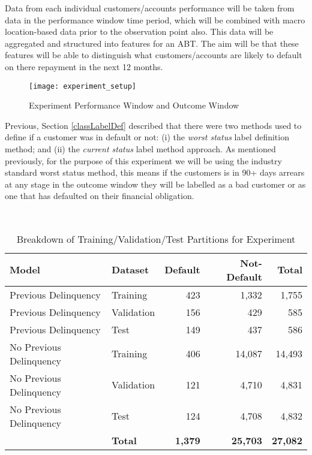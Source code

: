 Data from each individual customers/accounts performance will be taken from data in the performance window time period, which will be combined with macro location-based data prior to the observation point also. This data will be aggregated and structured into features for an ABT. The aim will be that these features will be able to distinguish what customers/accounts are likely to default on there repayment in the next 12 months. 

\begin{figure}[h!]
	\texttt{[image: experiment\_setup]}
	\caption[Experiment Performance Window and Outcome Window]
	{Experiment Performance Window and Outcome Window}
	\label{fig:experiment_setup}
\end{figure}

Previous, Section \ref{classLabelDef} described that there were two methods used to define if a customer was in default or not: (i) the \textit{worst status} label definition method; and (ii) the \textit{current status} label method approach. As mentioned previously, for the purpose of this experiment we will be using the industry standard worst status method, this means if the customers is in 90+ days arrears at any stage in the outcome window they will be labelled as a bad customer or as one that has defaulted on their financial obligation. 

\begin{table}[H]
	\centering\
	\resizebox{\textwidth}{!}
	{
		\begin{tabular}{l| l|r|r|r}
			\hline
			\textbf{Model} &  \textbf{Dataset} & \textbf{Default} & \textbf{Not-Default} & \textbf{Total} \\
			\hline
			Previous Delinquency          & Training       & 423 & 1,332 & 1,755 \\
			Previous Delinquency          & Validation       & 156 & 429 & 585 \\
			Previous Delinquency          & Test & 149 & 437 & 586 \\ \hline
			No Previous Delinquency          & Training & 406 & 14,087 & 14,493 \\ 
			No Previous Delinquency          & Validation & 121 & 4,710 & 4,831 \\
			No Previous Delinquency          & Test & 124 & 4,708 & 4,832 \\
			\hline
		       &      	\textbf{Total }     & \textbf{1,379} & \textbf{25,703} & \textbf{27,082} \\ \hline
		\end{tabular}
	}
	\caption{Breakdown of Training/Validation/Test Partitions for Experiment}
\end{table}

